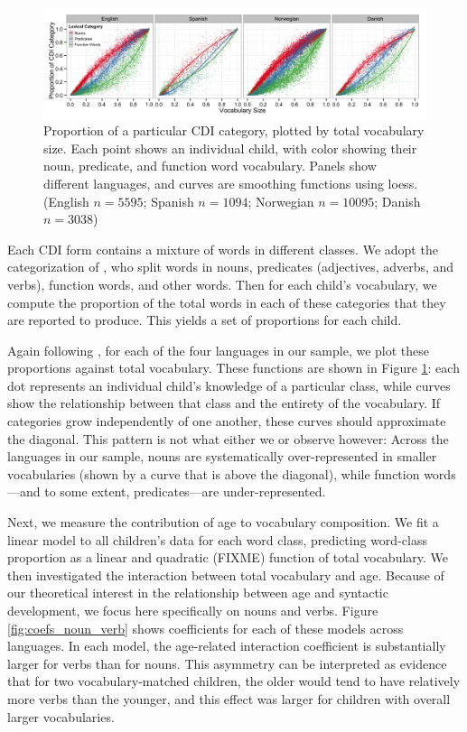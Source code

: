 \documentclass[10pt,letterpaper]{article}
\begin{document}
\begin{figure}[tb]
\begin{center}
\includegraphics[width=\textwidth]{plots/composition.png}
\end{center}
\caption{\label{fig:vocab_comp} Proportion of a particular CDI category, plotted by total vocabulary size. Each point shows an individual child, with color showing their noun, predicate, and function word vocabulary. Panels show different languages, and curves are smoothing functions using loess. (English $n=5595$; Spanish $n=1094$; Norwegian $n=10095$; Danish $n=3038$)} 
\end{figure}

Each CDI form contains a mixture of words in different classes. We adopt the categorization of , who split words in nouns, predicates (adjectives, adverbs, and verbs), function words, and other words. Then for each child's vocabulary, we compute the proportion of the total words in each of these categories that they are reported to produce. This yields a set of proportions for each child.

Again following , for each of the four languages in our sample, we plot these proportions against total vocabulary. These functions are shown in Figure \ref{fig:vocab_comp}: each dot represents an individual child's knowledge of a particular class, while curves show the relationship between that class and the entirety of the vocabulary. If categories grow independently of one another, these curves should approximate the diagonal. This pattern is not what either we or \citeauthor{bates1994} observe however: Across the languages in our sample, nouns are systematically over-represented in smaller vocabularies (shown by a curve that is above the diagonal), while function words---and to some extent, predicates---are under-represented. 

Next, we measure the contribution of age to vocabulary composition. We fit a linear model to all children's data for each word class, predicting word-class proportion as a linear and quadratic (FIXME) function of total vocabulary. We then investigated the interaction between total vocabulary and age. Because of our theoretical interest in the relationship between age and syntactic development, we focus here specifically on nouns and verbs. Figure \ref{fig:coefs_noun_verb} shows coefficients for each of these models across languages. In each model, the age-related interaction coefficient is substantially larger for verbs than for nouns. This asymmetry can be interpreted as evidence that for two vocabulary-matched children, the older would tend to have relatively more verbs than the younger, and this effect was larger for children with overall larger vocabularies.
\end{document}
